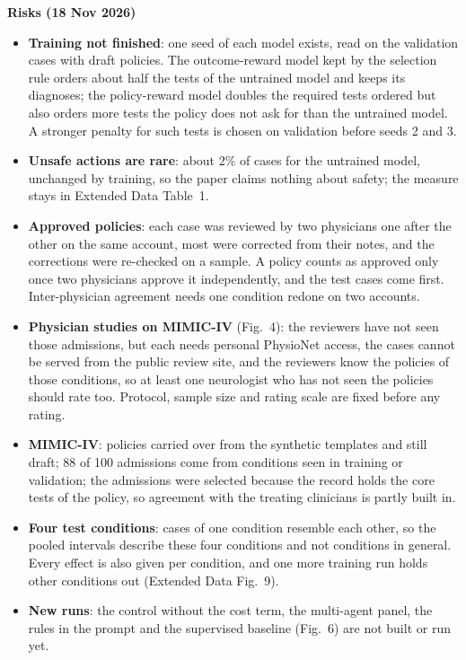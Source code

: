 \medskip
\noindent\textbf{Risks (18 Nov 2026)}
\begin{itemize}
\item \textbf{Training not finished}: one seed of each model exists, read on the validation cases with
draft policies. The outcome-reward model kept by the selection rule orders about half the tests of the
untrained model and keeps its diagnoses; the policy-reward model doubles the required tests ordered
but also orders more tests the policy does not ask for than the untrained model. A stronger penalty
for such tests is chosen on validation before seeds 2 and 3.
\item \textbf{Unsafe actions are rare}: about 2\% of cases for the untrained model, unchanged by
training, so the paper claims nothing about safety; the measure stays in Extended Data Table~1.
\item \textbf{Approved policies}: each case was reviewed by two physicians one after the other on the
same account, most were corrected from their notes, and the corrections were re-checked on a sample.
A policy counts as approved only once two physicians approve it independently, and the test cases
come first. Inter-physician agreement needs one condition redone on two accounts.
\item \textbf{Physician studies on MIMIC-IV} (Fig.~4): the reviewers have not seen those admissions,
but each needs personal PhysioNet access, the cases cannot be served from the public review site, and
the reviewers know the policies of those conditions, so at least one neurologist who has not seen the
policies should rate too. Protocol, sample size and rating scale are fixed before any rating.
\item \textbf{MIMIC-IV}: policies carried over from the synthetic templates and still draft; 88 of 100
admissions come from conditions seen in training or validation; the admissions were selected because
the record holds the core tests of the policy, so agreement with the treating clinicians is partly
built in.
\item \textbf{Four test conditions}: cases of one condition resemble each other, so the pooled
intervals describe these four conditions and not conditions in general. Every effect is also given per
condition, and one more training run holds other conditions out (Extended Data Fig.~9).
\item \textbf{New runs}: the control without the cost term, the multi-agent panel, the rules in the
prompt and the supervised baseline (Fig.~6) are not built or run yet.
\end{itemize}
